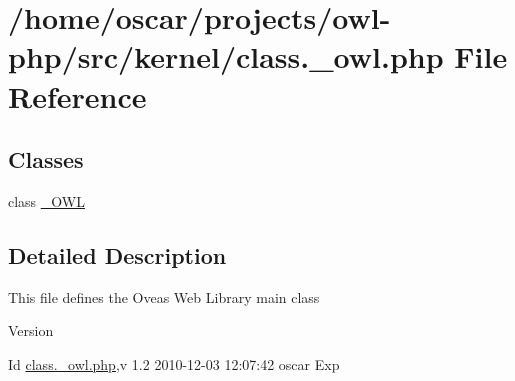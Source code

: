 \section{/home/oscar/projects/owl-\/php/src/kernel/class.\_\-owl.php File Reference}
\label{class_8__owl_8php}
\subsection*{Classes}
\begin{DoxyCompactItemize}
\item 
class \hyperlink{class__OWL}{\_\-OWL}
\end{DoxyCompactItemize}


\subsection{Detailed Description}
This file defines the Oveas Web Library main class \begin{DoxyVersion}{Version}

\end{DoxyVersion}
\begin{DoxyParagraph}{Id}
\hyperlink{class_8__owl_8php}{class.\_\-owl.php},v 1.2 2010-\/12-\/03 12:07:42 oscar Exp 
\end{DoxyParagraph}
